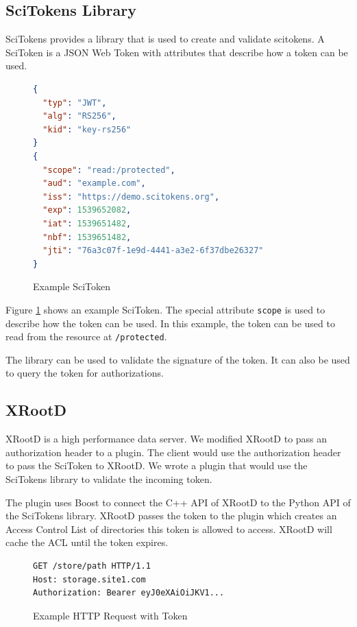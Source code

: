 \documentclass{webofc}
\begin{document}
\subsection{SciTokens Library}
\label{sec:scitokenslib}
SciTokens \cite{withers2018scitokens} provides a library that is used to create and validate scitokens.  A SciToken is a JSON Web Token \cite{jones2015json} with attributes that describe how a token can be used.


\begin{figure}[ht]
\begin{lstlisting}[language=json,firstnumber=1]
{
  "typ": "JWT",
  "alg": "RS256",
  "kid": "key-rs256"
}
{
  "scope": "read:/protected",
  "aud": "example.com",
  "iss": "https://demo.scitokens.org",
  "exp": 1539652082,
  "iat": 1539651482,
  "nbf": 1539651482,
  "jti": "76a3c07f-1e9d-4441-a3e2-6f37dbe26327"
}
\end{lstlisting}
\caption{Example SciToken}
\label{fig:scitoken}
\end{figure}

Figure \ref{fig:scitoken} shows an example SciToken.  The special attribute \texttt{scope} is used to describe how the token can be used.  In this example, the token can be used to read from the resource at \texttt{/protected}.

The library can be used to validate the signature of the token.  It can also be used to query the token for authorizations.


\subsection{XRootD}
\label{sec:xrootd}

XRootD is a high performance data server.  We modified XRootD to pass an authorization header to a plugin.  The client would use the authorization header to pass the SciToken to XRootD.  We wrote a plugin \cite{xrootd-scitokens} that would use the SciTokens library to validate the incoming token.

The plugin uses Boost \cite{dawes2009boost} to connect the C++ API of XRootD to the Python API of the SciTokens library.  XRootD passes the token to the plugin which creates an Access Control List of directories this token is allowed to access.  XRootD will cache the ACL until the token expires.

\begin{figure}[ht]
\begin{lstlisting}[language=httprequest,firstnumber=1]
GET /store/path HTTP/1.1
Host: storage.site1.com
Authorization: Bearer eyJ0eXAiOiJKV1...
\end{lstlisting}
    \caption{Example HTTP Request with Token}
    \label{fig:examplerequest}
\end{figure}
\end{document}
